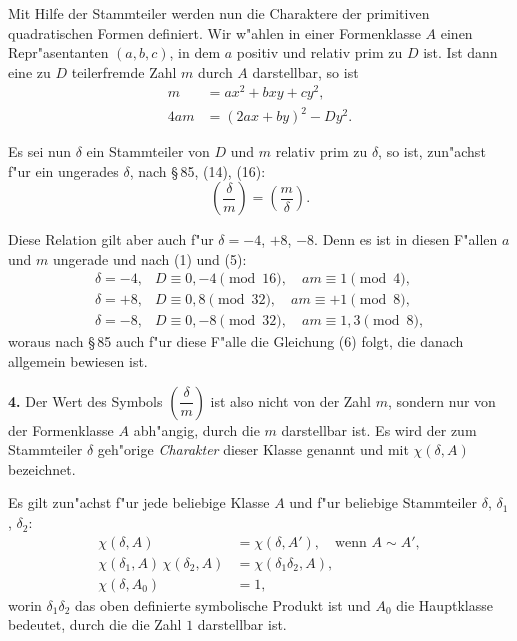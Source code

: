 \documentclass[11pt,a4paper]{article}
\theoremstyle{plain}
\newcommand{\sect}[1]{\S\,#1}
\begin{document}
Mit Hilfe der Stammteiler werden nun die Charaktere der primitiven quadratischen Formen definiert. Wir w"{a}hlen in einer Formenklasse $A$ einen Repr"{a}sentanten $(a,b,c)$, in dem $a$ positiv und relativ prim zu $D$ ist. Ist dann eine zu $D$ teilerfremde Zahl $m$ durch $A$ darstellbar, so ist
\begin{equation}
\label{eq:104_5}
\begin{aligned}
m &= ax^2 + bxy + cy^2,\\
4am &= (2ax + by)^2 - Dy^2.
\end{aligned}
\end{equation}

Es sei nun $\delta$ ein Stammteiler von $D$ und $m$ relativ prim zu $\delta$, so ist, zun"{a}chst f"{u}r ein ungerades $\delta$, nach \sect{85}, (14), (16):
\begin{equation}
\label{eq:104_6}
\left(\frac{\delta}{m}\right) = \left(\frac{m}{\delta}\right).
\end{equation}

Diese Relation gilt aber auch f"{u}r $\delta = -4$, $+8$, $-8$. Denn es ist in diesen F"{a}llen $a$ und $m$ ungerade und nach (1) und (5):
\[
\begin{array}{ll}
\delta = -4, & D \equiv 0, -4 \pmod{16}, \quad am \equiv 1 \pmod{4},\\[4pt]
\delta = +8, & D \equiv 0, 8 \pmod{32}, \quad am \equiv +1 \pmod{8},\\[4pt]
\delta = -8, & D \equiv 0, -8 \pmod{32}, \quad am \equiv 1, 3 \pmod{8},
\end{array}
\]
woraus nach \sect{85} auch f"{u}r diese F"{a}lle die Gleichung (6) folgt, die danach allgemein bewiesen ist.

\smallskip

\textbf{4.} Der Wert des Symbols $\left(\dfrac{\delta}{m}\right)$ ist also nicht von der Zahl $m$, sondern nur von der Formenklasse $A$ abh"{a}ngig, durch die $m$ darstellbar ist. Es wird der zum Stammteiler $\delta$ geh"{o}rige \emph{Charakter} dieser Klasse genannt und mit $\chi(\delta, A)$ bezeichnet.

\newpage
\setcounter{page}{382}

Es gilt zun"{a}chst f"{u}r jede beliebige Klasse $A$ und f"{u}r beliebige Stammteiler $\delta$, $\delta_1$, $\delta_2$:
\begin{align}
\label{eq:104_7}
\chi(\delta, A) &= \chi(\delta, A'), \quad \text{wenn } A \sim A',\\
\label{eq:104_8}
\chi(\delta_1, A)\,\chi(\delta_2, A) &= \chi(\delta_1\delta_2, A),\\
\label{eq:104_9}
\chi(\delta, A_0) &= 1,
\end{align}
worin $\delta_1\delta_2$ das oben definierte symbolische Produkt ist und $A_0$ die Hauptklasse bedeutet, durch die die Zahl $1$ darstellbar ist.
\end{document}
